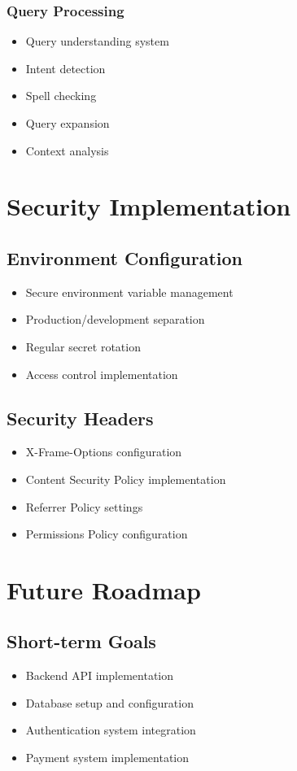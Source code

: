 \documentclass[12pt,a4paper]{article}
\begin{document}
\subsubsection{Query Processing}
\begin{itemize}
    \item Query understanding system
    \item Intent detection
    \item Spell checking
    \item Query expansion
    \item Context analysis
\end{itemize}

\section{Security Implementation}
\subsection{Environment Configuration}
\begin{itemize}
    \item Secure environment variable management
    \item Production/development separation
    \item Regular secret rotation
    \item Access control implementation
\end{itemize}

\subsection{Security Headers}
\begin{itemize}
    \item X-Frame-Options configuration
    \item Content Security Policy implementation
    \item Referrer Policy settings
    \item Permissions Policy configuration
\end{itemize}

\section{Future Roadmap}
\subsection{Short-term Goals}
\begin{itemize}
    \item Backend API implementation
    \item Database setup and configuration
    \item Authentication system integration
    \item Payment system implementation
\end{itemize}
\end{document}
